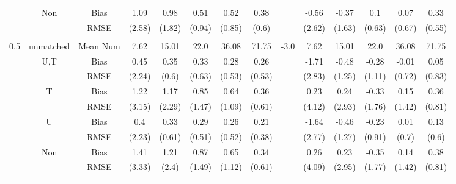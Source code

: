 \begin{tabular}{@{\extracolsep{5pt}}lc|cccccc|lccccc}
 & Non & Bias & 1.09 & 0.98 & 0.51 & 0.52 & 0.38 &  & -0.56 & -0.37 & 0.1 & 0.07 & 0.33 \\
 &  & RMSE & (2.58) & (1.82) & (0.94) & (0.85) & (0.6) &  & (2.62) & (1.63) & (0.63) & (0.67) & (0.55) \\
 &  &  &  &  &  &  &  &  &  &  &  &  &  \\
0.5 & unmatched & Mean Num & 7.62 & 15.01 & 22.0 & 36.08 & 71.75 & -3.0 & 7.62 & 15.01 & 22.0 & 36.08 & 71.75 \\
 & U,T & Bias & 0.45 & 0.35 & 0.33 & 0.28 & 0.26 &  & -1.71 & -0.48 & -0.28 & -0.01 & 0.05 \\
 &  & RMSE & (2.24) & (0.6) & (0.63) & (0.53) & (0.53) &  & (2.83) & (1.25) & (1.11) & (0.72) & (0.83) \\
 & T & Bias & 1.22 & 1.17 & 0.85 & 0.64 & 0.36 &  & 0.23 & 0.24 & -0.33 & 0.15 & 0.36 \\
 &  & RMSE & (3.15) & (2.29) & (1.47) & (1.09) & (0.61) &  & (4.12) & (2.93) & (1.76) & (1.42) & (0.81) \\
 & U & Bias & 0.4 & 0.33 & 0.29 & 0.26 & 0.21 &  & -1.64 & -0.46 & -0.23 & 0.01 & 0.13 \\
 &  & RMSE & (2.23) & (0.61) & (0.51) & (0.52) & (0.38) &  & (2.77) & (1.27) & (0.91) & (0.7) & (0.6) \\
 & Non & Bias & 1.41 & 1.21 & 0.87 & 0.65 & 0.34 &  & 0.26 & 0.23 & -0.35 & 0.14 & 0.38 \\
 &  & RMSE & (3.33) & (2.4) & (1.49) & (1.12) & (0.61) &  & (4.09) & (2.95) & (1.77) & (1.42) & (0.81) \\
 &  &  &  &  &  &  &  &  &  &  &  &  &  \\
\hline 
\bottomrule 
\end{tabular}
